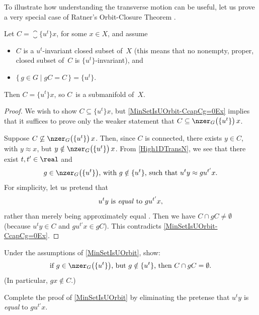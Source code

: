To illustrate how understanding the transverse motion can be useful, let us prove a very special case of Ratner's Orbit-Closure Theorem .

\begin{prop} \label{MinSetIsUOrbit}
Let $C = \closure{\{u^t\}x}$, for some $x \in X$, and assume
	\begin{itemize}
	\item $C$ is a  $u^t$-invariant closed subset of~$X$ 
	\textup(this means that no nonempty, proper, closed subset of~$C$ is\/ $\{u^t\}$-invariant\/\textup),
	and
	\item $\{\, g \in G \mid gC = C \,\} =  \{u^t\}$.
	\end{itemize}
Then $C = \{u^t\}x$, so $C$~is a submanifold of~$X$.
\end{prop}

\begin{proof}
We wish to show $C \subseteq \{u^t\}x$, but \cref{MinSetIsUOrbit-CcapCg=0Ex} implies that it suffices to prove only the weaker statement that $C \subseteq \nzer_G\bigl( \{u^t\} \bigr) \, x$.

Suppose $C \not\subseteq \nzer_G\bigl( \{u^t\} \bigr) \, x$. Then, since $C$ is connected, there exists $y \in C$, with $y \approx x$, but $y \notin \nzer_G\bigl( \{u^t\} \bigr) \, x$.
From \cref{High1DTransN}, we see that there exist $t,t' \in \real$ and 
	$$ \text{$g \in \nzer_G\bigl( \{u^t\} \bigr)$, with $g \notin \{u^t\}$, such that
	$ u^t y \approx g u^{t'} x $.} $$
For simplicity, let us pretend that 
	$$\text{$u^t y$ is \emph{equal} to $g u^{t'} x$} , $$
rather than merely being approximately equal . Then we have $C \cap gC \neq \emptyset$ (because $u^t y \in C$ and $g u^{t'} x \in g C$).
This contradicts \cref{MinSetIsUOrbit-CcapCg=0Ex}.
\end{proof}

\begin{exercises}

\item \label{MinSetIsUOrbit-CcapCg=0Ex}
Under the assumptions of \cref{MinSetIsUOrbit}, show: 
	$$ \text{if $g \in \nzer_G\bigl( \{u^t\} \bigr)$, but $g \notin \{u^t\}$, then $C \cap gC = \emptyset$.} $$ (In particular, $g x \notin C$.)

\item \label{MinSetIsUOrbit-xu=yuEx}
Complete the proof of \cref{MinSetIsUOrbit} by eliminating the pretense that $u^t y$ is \emph{equal} to $g u^{t'} x$.

\end{exercises}




